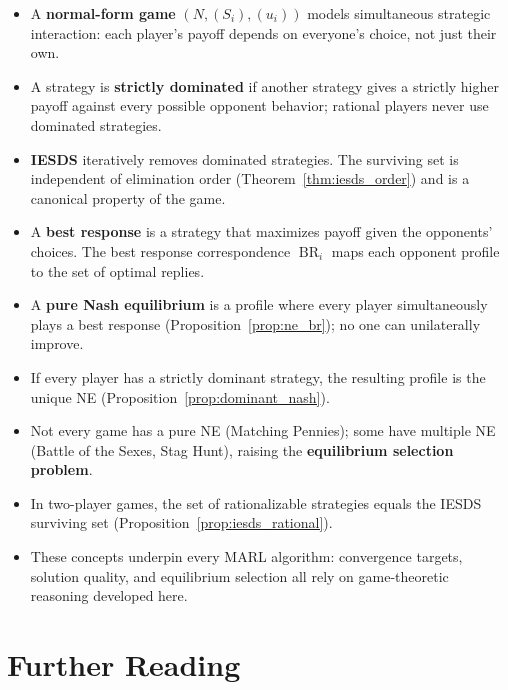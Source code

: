 \documentclass[11pt,a4paper]{article}
\DeclareMathOperator{\BR}{BR}
\begin{document}
\begin{itemize}
    \item A \textbf{normal-form game} $(N, (S_i), (u_i))$ models
    simultaneous strategic interaction: each player's payoff depends on
    everyone's choice, not just their own.
    \item A strategy is \textbf{strictly dominated} if another strategy
    gives a strictly higher payoff against every possible opponent
    behavior; rational players never use dominated strategies.
    \item \textbf{IESDS} iteratively removes dominated strategies.  The
    surviving set is independent of elimination order
    (Theorem~\ref{thm:iesds_order}) and is a canonical property of the game.
    \item A \textbf{best response} is a strategy that maximizes payoff given
    the opponents' choices.  The best response correspondence $\BR_i$ maps
    each opponent profile to the set of optimal replies.
    \item A \textbf{pure Nash equilibrium} is a profile where every player
    simultaneously plays a best response
    (Proposition~\ref{prop:ne_br}); no one can unilaterally improve.
    \item If every player has a strictly dominant strategy, the resulting
    profile is the unique NE (Proposition~\ref{prop:dominant_nash}).
    \item Not every game has a pure NE (Matching Pennies); some have
    multiple NE (Battle of the Sexes, Stag Hunt), raising the
    \textbf{equilibrium selection problem}.
    \item In two-player games, the set of rationalizable strategies equals
    the IESDS surviving set (Proposition~\ref{prop:iesds_rational}).
    \item These concepts underpin every MARL algorithm: convergence targets,
    solution quality, and equilibrium selection all rely on game-theoretic
    reasoning developed here.
\end{itemize}


\section{Further Reading}
\label{sec:further_reading}
\end{document}
